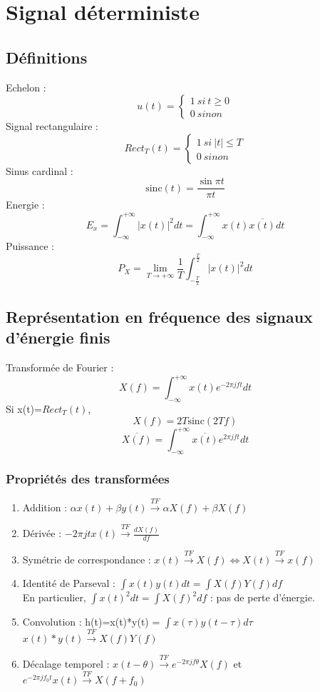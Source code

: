 \section{Signal déterministe}
\subsection{Définitions}
Echelon : \[u(t)=\left\{ \begin{array}{l} 1\ si\ t \geq 0 \\ 0 \ sinon \end{array} \right.\]
Signal rectangulaire : \[Rect_T(t) = \left\{ \begin{array}{l} 1\ si\ |t| \leq T \\ 0 \ sinon \end{array} \right.\]
Sinus cardinal : \[\mathrm{sinc}(t) = \frac{\sin{\pi t}}{\pi t}\]
Energie : \[E_x = \int_{-\infty}^{+\infty} |x(t)|^2 dt = \int_{-\infty}^{+\infty} x(t) \overline{x(t)} dt\]
Puissance : \[P_X = \lim_{T \to +\infty} \frac{1}{T} \int_{-\frac{T}{2}}^{\frac{T}{2}} |x(t)|^2 dt\]

\subsection{Représentation en fréquence des signaux d'énergie finis}
Transformée de Fourier : \[X(f)=\int_{-\infty}^{+\infty} x(t) e^{-2\pi jft}dt\]
Si x(t)=$Rect_T (t)$, \[X(f)=2T\mathrm{sinc}(2Tf)\]
\[\overline{X(f)}=\int_{-\infty}^{+\infty} \overline{x(t)} e^{2\pi jft}dt\]

\subsubsection{Propriétés des transformées}
\begin{enumerate}
\item Addition : $\alpha x(t)+\beta y(t) \xrightarrow{TF} \alpha X(f) + \beta X(f) $
\item Dérivée : $-2\pi jtx(t) \xrightarrow{TF} \frac{dX(f)}{df}$ 
\item Symétrie de correspondance : $x(t)\xrightarrow{TF} X(f) \Leftrightarrow X(t) \xrightarrow{TF} x(f) $
\item Identité de Parseval : $\int x(t)y(t) dt = \int X(f)Y(f) df $ \\
En particulier, $\int x(t)^2 dt = \int X(f)^2 df$ : pas de perte d'énergie.
\item Convolution : h(t)=x(t)*y(t) = $\int x(\tau)y(t-\tau) d\tau$ \\
$x(t)*y(t) \xrightarrow{TF} X(f)Y(f)$
\item Décalage temporel : $x(t-\theta) \xrightarrow{TF} e^{-2\pi jf\theta} X(f)$ et $e^{-2\pi jf_0t} x(t) \xrightarrow{TF} X(f+f_0)$
\end{enumerate}

